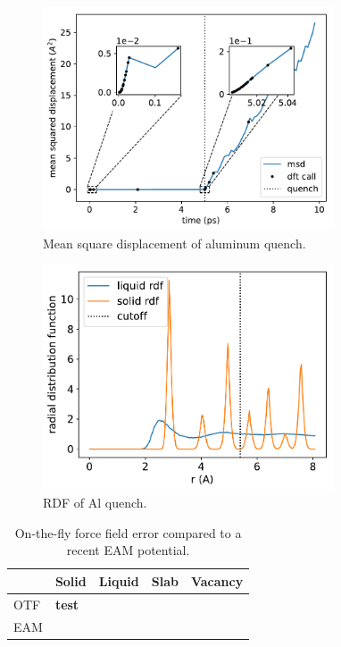 \documentclass[%
reprint,
superscriptaddress,
amsmath,amssymb,
aps,
prl,
]{revtex4-1}
\begin{document}
\maketitle


\begin{figure}
	\centering
	\includegraphics[width=3.4in]{melt_msd.pdf}
	\caption{Mean square displacement of aluminum quench.}
\end{figure}

\begin{figure}
	\centering
	\includegraphics[width=3.4in]{rdf.pdf}
	\caption{RDF of Al quench.}
\end{figure}

\begin{table}
\begin{tabular}
{ |p{1.4cm}|| >{\centering} p{1.4cm}| >{\centering} p{1.4cm}| >{\centering} p{1.4cm}| p{1.4cm} <{\centering}|  }
	\hline
	 & Solid & Liquid & Slab & Vacancy \\
	\hline
	OTF & \bf{test} & & & \\
	\hline
	EAM & & & & \\
	\hline
\end{tabular}
\caption{On-the-fly force field error compared to a recent EAM potential.}
\end{table}
\end{document}
